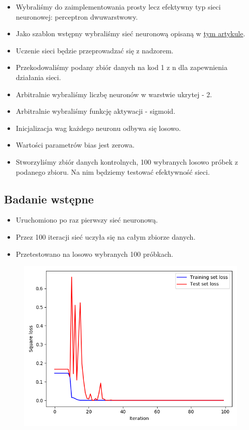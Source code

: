 \documentclass[12pt,a4paper]{article}
\begin{document}
\begin{itemize}
	\item 	Wybraliśmy do zaimplementowania prosty lecz efektywny typ sieci neuronowej: perceptron dwuwarstwowy.
  \item 	Jako szablon wstępny wybraliśmy sieć neuronową opisaną w \href{https://towardsdatascience.com/how-to-build-your-own-neural-network-from-scratch-in-python-68998a08e4f6}{tym artykule}.
  \item 	Uczenie sieci będzie przeprowadzać się z nadzorem.
  \item 	Przekodowaliśmy podany zbiór danych na kod 1 z n dla zapewnienia działania sieci.
  \item	Arbitralnie wybraliśmy liczbę neuronów w warstwie ukrytej - 2.
  \item 	Arbitralnie wybraliśmy funkcję aktywacji - sigmoid.
  \item 	Inicjalizacja wag każdego neuronu odbywa się losowo.
  \item 	Wartości parametrów bias jest zerowa.
  \item 	Stworzyliśmy zbiór danych kontrolnych, 100 wybranych losowo próbek z podanego zbioru. Na nim będziemy testować efektywność sieci.

\end{itemize}

\pagebreak
\subsection{Badanie wstępne}

\begin{itemize}
	\item 	Uruchomiono po raz pierwszy sieć neuronową.
  \item	Przez 100 iteracji sieć uczyła się na całym zbiorze danych.
  \item 	Przetestowano na losowo wybranych 100 próbkach.
\end{itemize}

\begin{figure}[h]
  \centering
  \includegraphics[width=1.0\textwidth]{charts/double_activation/first_chart.png}
  \caption{}
  \label{}
\end{figure}
\end{document}
